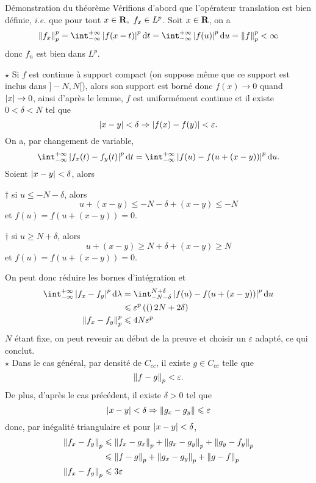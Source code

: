\documentclass[a4paper,11pt, twoside]{article}
\begin{document}
\begin{ProofC}{Démonstration du théorème}
  Vérifions d'abord que l'opérateur translation est bien définie, \emph{i.e.} que pour tout $x\in\mathbf R,\ f_x\in L^p$. Soit $x\in\mathbf R$, on a 
  $$\norm{f_x}_p^p=\int_{-\infty}^{+\infty}\abs{f(x-t)}^p\dt=\int_{-\infty}^{+\infty}\abs{f(u)}^p\mathrm du=\norm{f}_p^p<\infty$$
  donc $f_n$ est bien dans $L^p$.

  $\star$ Si $f$ est continue à support compact (on suppose même que ce support est inclus dans $]-N,N[$), alors son support est borné donc $f(x)\longrightarrow 0$ quand $\left| x\right|\to 0$, ainsi d'après le lemme, $f$ est uniformément continue et il existe $0<\delta<N$ tel que 
  $$\left| x-y\right|<\delta\Rightarrow \left| f(x)-f(y)\right|<\varepsilon.$$
  On a, par changement de variable,
  $$\intI \abs{f_x(t)-f_y(t)}^p\dt=\intI\abs{f(u)-f(u+(x-y))}^p\mathrm du.$$
  Soient $\left| x-y\right|<\delta$, alors

  $\dagger$ si $u\leqslant -N-\delta$, alors 
  $$u+(x-y)\leqslant  -N-\delta+(x-y)\leqslant -N$$
  et $f(u)=f(u+(x-y))=0$.

  $\dagger$ si $u\geqslant N+\delta$, alors 
  $$u+(x-y)\geqslant N+\delta+(x-y)\geqslant N$$
  et $f(u)=f(u+(x-y))=0$.

  On peut donc réduire les bornes d'intégration et 
  \begin{align*}
    \intI\abs{f_x-f_y}^p\mathrm d\lambda&=\int_{-N-\delta}^{N+\delta}\abs{f(u)-f(u+(x-y))}^p\mathrm du\\
    &\leqslant \varepsilon^p\Par(2N+2\delta)\\
    \norm{f_x-f_y}_p^p&\leqslant 4N\varepsilon^p
  \end{align*}
  $N$ étant fixe, on peut revenir au début de la preuve et choisir un $\varepsilon$ adapté, ce qui conclut.\\

  $\star$ Dans le cas général, par densité de $C_{cc}$, il existe $g\in C_{cc}$ telle que 
  $$\left\lVert f-g\right\rVert_p<\varepsilon.$$
  De plus, d'après le cas précédent, il existe $\delta>0$ tel que 
  $$\left| x-y\right|<\delta\Rightarrow\left\lVert g_x-g_y\right\rVert\leqslant \varepsilon$$
  donc, par inégalité triangulaire et pour $\left| x-y\right|<\delta$,
  \begin{align*}
    \left\lVert f_x-f_y\right\rVert_p&\leqslant \left\lVert f_x-g_x\right\rVert_p+\left\lVert g_x-g_y\right\rVert_p+\left\lVert g_y-f_y\right\rVert_p\\
    &\leqslant \left\lVert f-g\right\rVert_p+\left\lVert g_x-g_y\right\rVert_p+\left\lVert g-f\right\rVert_p\\
    \left\lVert f_x-f_y\right\rVert_p&\leqslant 3\varepsilon
  \end{align*}
\end{ProofC}
\end{document}
